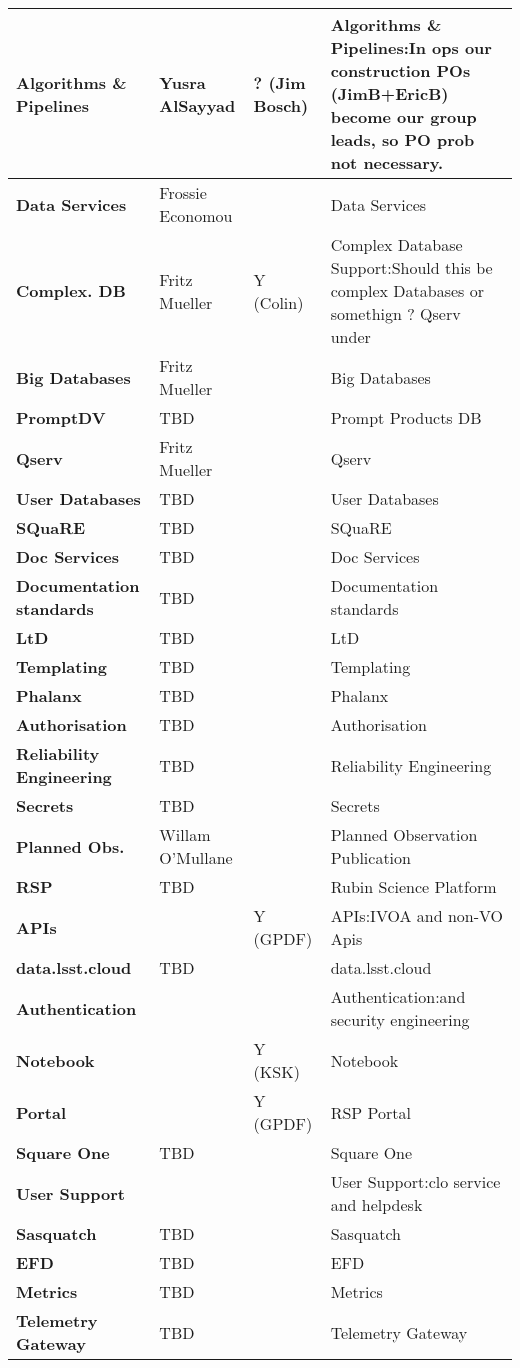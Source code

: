 \begin{longtable} {
|p{}   |p{}|p{} |p{}|}
{\textbf{Algorithms \&  Pipelines}} & Yusra AlSayyad & ? (Jim Bosch) & Algorithms \&  Pipelines:In ops our construction POs (JimB+EricB) become our group leads, so PO prob not necessary. \\ \hline
{\textbf{Data Services}} & Frossie Economou &  & Data Services \\ \hline
{\textbf{Complex. DB}} & Fritz Mueller & Y (Colin) & Complex Database Support:Should this be complex Databases or somethign ? Qserv under \\ \hline
{\textbf{Big Databases}} & Fritz Mueller &  & Big Databases \\ \hline
{\textbf{PromptDV}} & TBD &  & Prompt Products DB \\ \hline
{\textbf{Qserv}} & Fritz Mueller &  & Qserv \\ \hline
{\textbf{User Databases}} & TBD &  & User Databases \\ \hline
{\textbf{SQuaRE}} & TBD &  & SQuaRE \\ \hline
{\textbf{Doc Services}} & TBD &  & Doc Services \\ \hline
{\textbf{Documentation standards}} & TBD &  & Documentation standards \\ \hline
{\textbf{LtD}} & TBD &  & LtD \\ \hline
{\textbf{Templating}} & TBD &  & Templating \\ \hline
{\textbf{Phalanx}} & TBD &  & Phalanx \\ \hline
{\textbf{Authorisation}} & TBD &  & Authorisation \\ \hline
{\textbf{Reliability Engineering}} & TBD &  & Reliability Engineering \\ \hline
{\textbf{Secrets}} & TBD &  & Secrets \\ \hline
{\textbf{Planned Obs.}} & Willam O'Mullane &  & Planned Observation Publication \\ \hline
{\textbf{RSP}} & TBD &  & Rubin Science Platform \\ \hline
{\textbf{APIs}} &  & Y (GPDF) & APIs:IVOA and non-VO Apis \\ \hline
{\textbf{data.lsst.cloud}} & TBD &  & data.lsst.cloud \\ \hline
{\textbf{Authentication}} &  &  & Authentication:and security engineering \\ \hline
{\textbf{Notebook}} &  & Y (KSK) & Notebook \\ \hline
{\textbf{Portal}} &  & Y (GPDF) & RSP Portal \\ \hline
{\textbf{Square One}} & TBD &  & Square One \\ \hline
{\textbf{User Support}} &  &  & User Support:clo service and helpdesk \\ \hline
{\textbf{Sasquatch}} & TBD &  & Sasquatch \\ \hline
{\textbf{EFD}} & TBD &  & EFD \\ \hline
{\textbf{Metrics}} & TBD &  & Metrics \\ \hline
{\textbf{Telemetry Gateway}} & TBD &  & Telemetry Gateway \\ \hline
\end{longtable}
\normalsize
